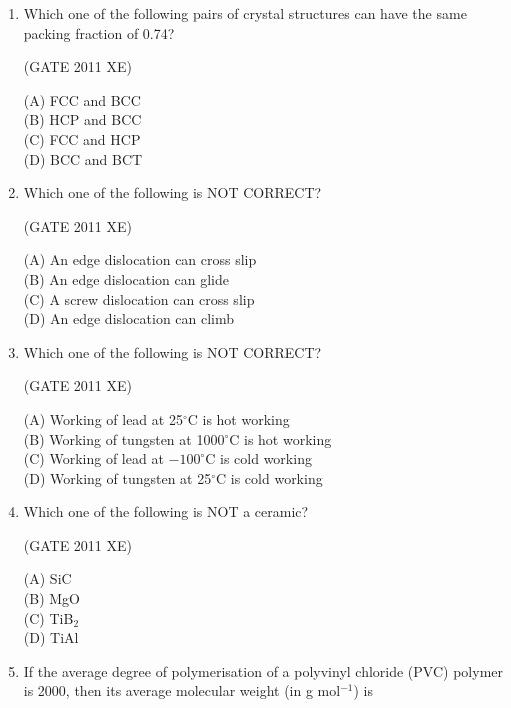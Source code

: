 \documentclass[journal,12pt,onecolumn]{IEEEtran}
\begin{document}
\begin{enumerate}

\item Which one of the following pairs of crystal structures can have the same packing fraction of 0.74?

\hfill{(GATE 2011 XE)}\\
\begin{multicols}{4}
(A) FCC and BCC \\
(B) HCP and BCC \\
(C) FCC and HCP \\
(D) BCC and BCT
\end{multicols}

\item Which one of the following is NOT CORRECT?

\hfill{(GATE 2011 XE)}\\
\begin{multicols}{2}
(A) An edge dislocation can cross slip \\
(B) An edge dislocation can glide \\
(C) A screw dislocation can cross slip \\
(D) An edge dislocation can climb
\end{multicols}

\item Which one of the following is NOT CORRECT?

\hfill{(GATE 2011 XE)}\\
\begin{multicols}{2}
(A) Working of lead at 25$^\circ$C is hot working \\
(B) Working of tungsten at 1000$^\circ$C is hot working \\
(C) Working of lead at $-100^\circ$C is cold working \\
(D) Working of tungsten at 25$^\circ$C is cold working
\end{multicols}

\item Which one of the following is NOT a ceramic?

\hfill{(GATE 2011 XE)}\\
\begin{multicols}{4}
(A) SiC \\
(B) MgO \\
(C) TiB$_2$ \\
(D) TiAl
\end{multicols}

\item If the average degree of polymerisation of a polyvinyl chloride (PVC) polymer is 2000, then its average molecular weight (in g mol$^{-1}$) is


\end{enumerate}
\end{document}
